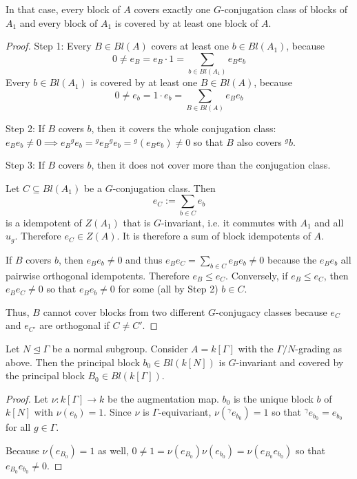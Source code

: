 \begin{lemma}
In that case, every block of $A$ covers exactly one $G$-conjugation class of blocks of $A_1$ and every block of $A_1$ is covered by at least one block of $A$.
\end{lemma}
\begin{proof}
Step 1: Every $B\in Bl(A)$ covers at least one $b\in Bl(A_1)$, because
\[0\neq e_B = e_B\cdot 1 = \sum_{b\in Bl(A_1)} e_B e_b\]
Every $b\in Bl(A_1)$ is covered by at least one $B\in Bl(A)$, because
\[0\neq e_b = 1\cdot e_b = \sum_{B\in Bl(A)} e_B e_b\]

\smallbreak
Step 2: If $B$ covers $b$, then it covers the whole conjugation class: $e_B e_b\neq 0 \implies e_B {^g e_b} = {^g e_B} {^g e_b} = {^g (e_B e_b)} \neq 0$ so that $B$ also covers ${^g b}$.

\smallbreak
Step 3: If $B$ covers $b$, then it does not cover more than the conjugation class.

Let $C\subseteq Bl(A_1)$ be a $G$-conjugation class. Then
\[e_C := \sum_{b\in C} e_b\]
is a idempotent of $Z(A_1)$ that is $G$-invariant, i.e. it commutes with $A_1$ and all $u_g$. Therefore $e_C\in Z(A)$. It is therefore a sum of block idempotents of $A$.

If $B$ covers $b$, then $e_B e_b\neq 0$ and thus $e_B e_C = \sum_{b\in C} e_B e_b\neq 0$ because the $e_B e_b$ all pairwise orthogonal idempotents. Therefore $e_B \leq e_C$. Conversely, if $e_B \leq e_C$, then $e_B e_C\neq 0$ so that $e_B e_b\neq 0$ for some (all by Step 2) $b\in C$.

Thus, $B$ cannot cover blocks from two different $G$-conjugacy classes because $e_C$ and $e_{C'}$ are orthogonal if $C\neq C'$.
\end{proof}

\begin{example}
Let $N\unlhd\Gamma$ be a normal subgroup. Consider $A=k[\Gamma]$ with the $\Gamma/N$-grading as above. Then the principal block $b_0\in Bl(k[N])$ is $G$-invariant and covered by the principal block $B_0\in Bl(k[\Gamma])$.
\end{example}
\begin{proof}
Let $\nu: k[\Gamma] \to k$ be the augmentation map. $b_0$ is the unique block $b$ of $k[N]$ with $\nu(e_b)=1$. Since $\nu$ is $\Gamma$-equivariant, $\nu({^\gamma e_{b_0}}) = 1$ so that ${^\gamma e_{b_0}} = e_{b_0}$ for all $g\in\Gamma$.

Because $\nu(e_{B_0})=1$ as well, $0\neq 1=\nu(e_{B_0})\nu(e_{b_0})=\nu(e_{B_0}e_{b_0})$ so that $e_{B_0}e_{b_0}\neq 0$.
\end{proof}

